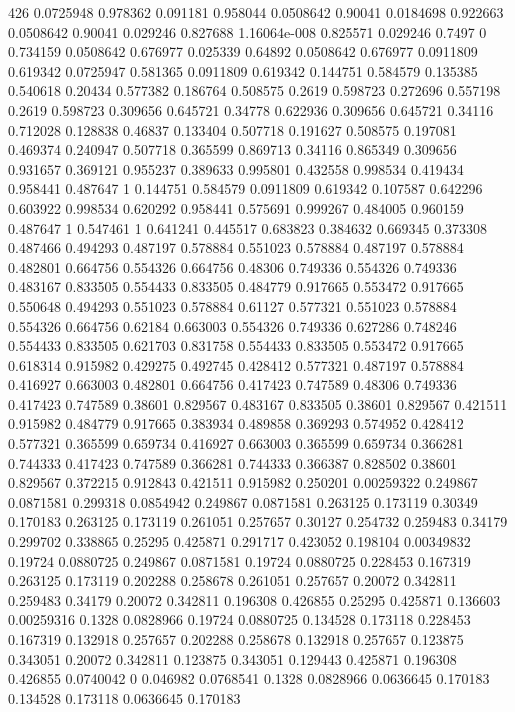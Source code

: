 426
0.0725948 0.978362
0.091181 0.958044
0.0508642 0.90041
0.0184698 0.922663
0.0508642 0.90041
0.029246 0.827688
1.16064e-008 0.825571
0.029246 0.7497
0 0.734159
0.0508642 0.676977
0.025339 0.64892
0.0508642 0.676977
0.0911809 0.619342
0.0725947 0.581365
0.0911809 0.619342
0.144751 0.584579
0.135385 0.540618
0.20434 0.577382
0.186764 0.508575
0.2619 0.598723
0.272696 0.557198
0.2619 0.598723
0.309656 0.645721
0.34778 0.622936
0.309656 0.645721
0.34116 0.712028
0.128838 0.46837
0.133404 0.507718
0.191627 0.508575
0.197081 0.469374
0.240947 0.507718
0.365599 0.869713
0.34116 0.865349
0.309656 0.931657
0.369121 0.955237
0.389633 0.995801
0.432558 0.998534
0.419434 0.958441
0.487647 1
0.144751 0.584579
0.0911809 0.619342
0.107587 0.642296
0.603922 0.998534
0.620292 0.958441
0.575691 0.999267
0.484005 0.960159
0.487647 1
0.547461 1
0.641241 0.445517
0.683823 0.384632
0.669345 0.373308
0.487466 0.494293
0.487197 0.578884
0.551023 0.578884
0.487197 0.578884
0.482801 0.664756
0.554326 0.664756
0.48306 0.749336
0.554326 0.749336
0.483167 0.833505
0.554433 0.833505
0.484779 0.917665
0.553472 0.917665
0.550648 0.494293
0.551023 0.578884
0.61127 0.577321
0.551023 0.578884
0.554326 0.664756
0.62184 0.663003
0.554326 0.749336
0.627286 0.748246
0.554433 0.833505
0.621703 0.831758
0.554433 0.833505
0.553472 0.917665
0.618314 0.915982
0.429275 0.492745
0.428412 0.577321
0.487197 0.578884
0.416927 0.663003
0.482801 0.664756
0.417423 0.747589
0.48306 0.749336
0.417423 0.747589
0.38601 0.829567
0.483167 0.833505
0.38601 0.829567
0.421511 0.915982
0.484779 0.917665
0.383934 0.489858
0.369293 0.574952
0.428412 0.577321
0.365599 0.659734
0.416927 0.663003
0.365599 0.659734
0.366281 0.744333
0.417423 0.747589
0.366281 0.744333
0.366387 0.828502
0.38601 0.829567
0.372215 0.912843
0.421511 0.915982
0.250201 0.00259322
0.249867 0.0871581
0.299318 0.0854942
0.249867 0.0871581
0.263125 0.173119
0.30349 0.170183
0.263125 0.173119
0.261051 0.257657
0.30127 0.254732
0.259483 0.34179
0.299702 0.338865
0.25295 0.425871
0.291717 0.423052
0.198104 0.00349832
0.19724 0.0880725
0.249867 0.0871581
0.19724 0.0880725
0.228453 0.167319
0.263125 0.173119
0.202288 0.258678
0.261051 0.257657
0.20072 0.342811
0.259483 0.34179
0.20072 0.342811
0.196308 0.426855
0.25295 0.425871
0.136603 0.00259316
0.1328 0.0828966
0.19724 0.0880725
0.134528 0.173118
0.228453 0.167319
0.132918 0.257657
0.202288 0.258678
0.132918 0.257657
0.123875 0.343051
0.20072 0.342811
0.123875 0.343051
0.129443 0.425871
0.196308 0.426855
0.0740042 0
0.046982 0.0768541
0.1328 0.0828966
0.0636645 0.170183
0.134528 0.173118
0.0636645 0.170183
